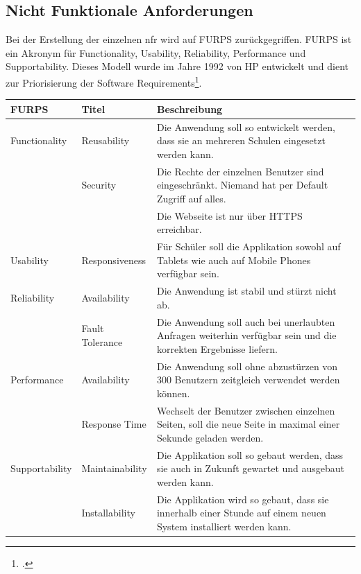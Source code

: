 \newpage

\subsection{Nicht Funktionale Anforderungen}
\label{chapter_nfr}
Bei der Erstellung der einzelnen \gls{nfr} wird auf FURPS zurückgegriffen. FURPS ist ein Akronym für Functionality, Usability, Reliability, Performance und Supportability. Dieses Modell wurde im Jahre 1992 von HP entwickelt und dient zur Priorisierung der Software Requirements\footcite{furps_description}. \\

\begin{table}[h]
	\centering
	\begin{tabu} to 0.9\textwidth {l l X}
	\toprule
	FURPS & Titel & Beschreibung \\ 
	\midrule
	Functionality & Reusability & Die Anwendung soll so entwickelt werden, dass sie an mehreren Schulen eingesetzt werden kann. \\
	& 	Security & Die Rechte der einzelnen Benutzer sind eingeschränkt. Niemand hat per Default Zugriff auf alles. \\
	&  & Die Webseite ist nur über HTTPS erreichbar. \\
	\midrule
	Usability & Responsiveness & Für Schüler soll die Applikation sowohl auf Tablets wie auch auf Mobile Phones verfügbar sein. \\
	\midrule
	Reliability & Availability & Die Anwendung ist stabil und stürzt nicht ab. \\
	& Fault Tolerance & Die Anwendung soll auch bei unerlaubten Anfragen weiterhin verfügbar sein und die korrekten Ergebnisse liefern. \\
	\midrule
	Performance & Availability & Die Anwendung soll ohne abzustürzen von 300 Benutzern zeitgleich verwendet werden können. \\
	 & Response Time & Wechselt der Benutzer zwischen einzelnen Seiten, soll die neue Seite in maximal einer Sekunde geladen werden.\\
	\midrule
	Supportability & Maintainability & Die Applikation soll so gebaut werden, dass sie auch in Zukunft gewartet und ausgebaut werden kann. \\
	 & Installability & Die Applikation wird so gebaut, dass sie innerhalb einer Stunde auf einem neuen System installiert werden kann. \\
	\bottomrule
	\end{tabu}
	\label{nfr}
\end{table}


\newpage